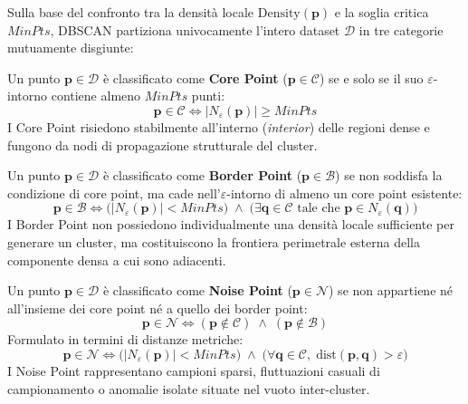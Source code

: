 Sulla base del confronto tra la densità locale $\mathrm{Density}(\mathbf{p})$ e la soglia critica $MinPts$, DBSCAN partiziona univocamente l'intero dataset $\mathcal{D}$ in tre categorie mutuamente disgiunte:

\begin{definition}
Un punto $\mathbf{p} \in \mathcal{D}$ è classificato come \textbf{Core Point} ($\mathbf{p} \in \mathcal{C}$) se e solo se il suo $\varepsilon$-intorno contiene almeno $MinPts$ punti:
\begin{equation}
    \mathbf{p} \in \mathcal{C} \iff |N_\varepsilon(\mathbf{p})| \ge MinPts
    \label{eq:dm-core-point-condition}
\end{equation}
I Core Point risiedono stabilmente all'interno (\textit{interior}) delle regioni dense e fungono da nodi di propagazione strutturale del cluster.
\end{definition}

\begin{definition}
Un punto $\mathbf{p} \in \mathcal{D}$ è classificato come \textbf{Border Point} ($\mathbf{p} \in \mathcal{B}$) se non soddisfa la condizione di core point, ma cade nell'$\varepsilon$-intorno di almeno un core point esistente:
\begin{equation}
    \mathbf{p} \in \mathcal{B} \iff \Big(|N_\varepsilon(\mathbf{p})| < MinPts\Big) \;\land\; \Big(\exists \mathbf{q} \in \mathcal{C} \text{ tale che } \mathbf{p} \in N_\varepsilon(\mathbf{q})\Big)
    \label{eq:dm-border-point-condition}
\end{equation}
I Border Point non possiedono individualmente una densità locale sufficiente per generare un cluster, ma costituiscono la frontiera perimetrale esterna della componente densa a cui sono adiacenti.
\end{definition}

\begin{definition}
Un punto $\mathbf{p} \in \mathcal{D}$ è classificato come \textbf{Noise Point} ($\mathbf{p} \in \mathcal{N}$) se non appartiene né all'insieme dei core point né a quello dei border point:
\begin{equation}
    \mathbf{p} \in \mathcal{N} \iff (\mathbf{p} \notin \mathcal{C}) \;\land\; (\mathbf{p} \notin \mathcal{B})
    \label{eq:dm-noise-point-condition}
\end{equation}
Formulato in termini di distanze metriche:
\begin{equation}
    \mathbf{p} \in \mathcal{N} \iff \Big(|N_\varepsilon(\mathbf{p})| < MinPts\Big) \;\land\; \Big(\forall \mathbf{q} \in \mathcal{C}, \; \mathrm{dist}(\mathbf{p}, \mathbf{q}) > \varepsilon\Big)
\end{equation}
I Noise Point rappresentano campioni sparsi, fluttuazioni casuali di campionamento o anomalie isolate situate nel vuoto inter-cluster.
\end{definition}

